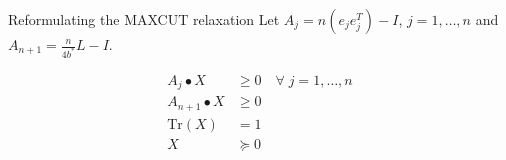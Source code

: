 \documentclass{beamer}
\begin{document}

\begin{frame}{Reformulating the MAXCUT relaxation}
Let $A_j = n(e_je_j^T) - I$, $j = 1, \dots, n$ and $A_{n+1} = \frac{n}{4b^*} L - I$. 

\begin{align*}
A_j \bullet X &\geq 0 \quad \forall \; j = 1,\ldots,n \\
A_{n+1} \bullet X &\geq 0 \\
\text{Tr}(X) &= 1 \\
X &\succcurlyeq 0
\end{align*}
\end{frame}



\end{document}
